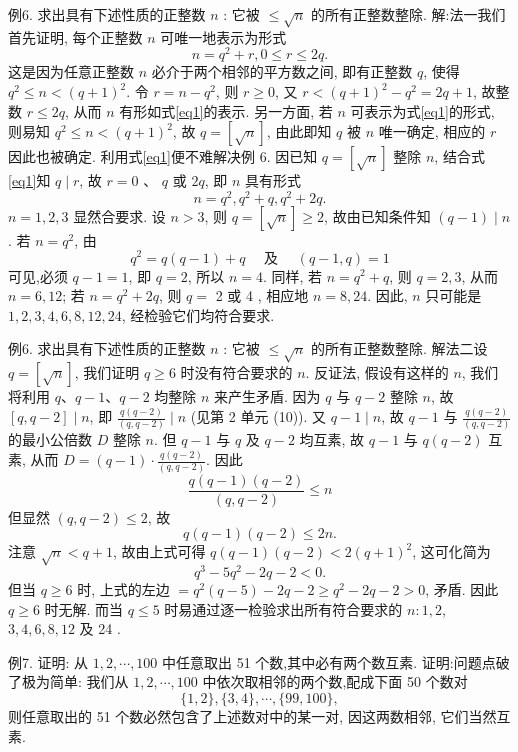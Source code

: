 例6. 求出具有下述性质的正整数 $n$ : 它被 $\leqslant \sqrt{n}$ 的所有正整数整除.
解:法一我们首先证明, 每个正整数 $n$ 可唯一地表示为形式
$$
n=q^2+r, 0 \leqslant r \leqslant 2 q. \label{eq1}
$$
这是因为任意正整数 $n$ 必介于两个相邻的平方数之间, 即有正整数 $q$, 使得 $q^2 \leqslant n<(q+1)^2$. 令 $r=n-q^2$, 则 $r \geqslant 0$, 又 $r<(q+1)^2-q^2=2 q+1$, 故整数 $r \leqslant 2 q$, 从而 $n$ 有形如式\ref{eq1}的表示.
另一方面, 若 $n$ 可表示为式\ref{eq1}的形式, 则易知 $q^2 \leqslant n<(q+1)^2$, 故 $q= [\sqrt{n}]$, 由此即知 $q$ 被 $n$ 唯一确定, 相应的 $r$ 因此也被确定.
利用式\ref{eq1}便不难解决例 6. 因已知 $q=[\sqrt{n}]$ 整除 $n$, 结合式\ref{eq1}知 $q \mid r$, 故 $r=0$ 、 $q$ 或 $2 q$, 即 $n$ 具有形式
$$
n=q^2, q^2+q, q^2+2 q .
$$
$n=1,2,3$ 显然合要求.
设 $n>3$, 则 $q=[\sqrt{n}] \geqslant 2$, 故由已知条件知
$(q-1) \mid n$. 若 $n=q^2$, 由
$$
q^2=q(q-1)+q \quad \text { 及 } \quad(q-1, q)=1
$$
可见,必须 $q-1=1$, 即 $q=2$, 所以 $n=4$.
同样, 若 $n=q^2+q$, 则 $q=2,3$, 从而 $n=6,12$; 若 $n=q^2+2 q$, 则 $q=$ 2 或 4 , 相应地 $n=8,24$. 因此, $n$ 只可能是 $1,2,3,4,6,8,12,24$, 经检验它们均符合要求.



例6. 求出具有下述性质的正整数 $n$ : 它被 $\leqslant \sqrt{n}$ 的所有正整数整除.
解法二设 $q=[\sqrt{n}]$, 我们证明 $q \geqslant 6$ 时没有符合要求的 $n$. 反证法, 假设有这样的 $n$, 我们将利用 $q 、 q-1 、 q-2$ 均整除 $n$ 来产生矛盾.
因为 $q$ 与 $q-2$ 整除 $n$, 故 $[q, q-2] \mid n$, 即 $\frac{q(q-2)}{(q, q-2)} \mid n$ (见第 2 单元 (10)). 又 $q-1 \mid n$, 故 $q-1$ 与 $\frac{q(q-2)}{(q, q-2)}$ 的最小公倍数 $D$ 整除 $n$. 但 $q-1$ 与 $q$ 及 $q-2$ 均互素, 故 $q-1$ 与 $q(q-2)$ 互素, 从而 $D=(q-1) \cdot \frac{q(q-2)}{(q, q-2)}$. 因此
$$
\frac{q(q-1)(q-2)}{(q, q-2)} \leqslant n
$$
但显然 $(q, q-2) \leqslant 2$, 故
$$
q(q-1)(q-2) \leqslant 2 n .
$$
注意 $\sqrt{n}<q+1$, 故由上式可得 $q(q-1)(q-2)<2(q+1)^2$, 这可化简为
$$
q^3-5 q^2-2 q-2<0 .
$$
但当 $q \geqslant 6$ 时, 上式的左边 $=q^2(q-5)-2 q-2 \geqslant q^2-2 q-2>0$, 矛盾.
因此 $q \geqslant 6$ 时无解.
而当 $q \leqslant 5$ 时易通过逐一检验求出所有符合要求的 $n: 1,2$, $3,4,6,8,12$ 及 24 .



例7. 证明: 从 $1,2, \cdots, 100$ 中任意取出 51 个数,其中必有两个数互素.
证明:问题点破了极为简单: 我们从 $1,2, \cdots, 100$ 中依次取相邻的两个数,配成下面 50 个数对
$$
\{1,2\},\{3,4\}, \cdots,\{99,100\},
$$
则任意取出的 51 个数必然包含了上述数对中的某一对, 因这两数相邻, 它们当然互素.



